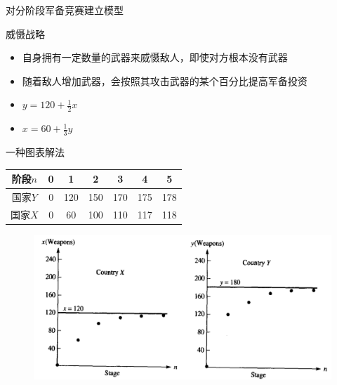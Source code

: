 \documentclass[mathserif, table]{beamer}
\begin{document}
\begin{frame}{对分阶段军备竞赛建立模型}
  \begin{block}{威慑战略}
    \begin{itemize}
    \item 自身拥有一定数量的武器来威慑敌人，即使对方根本没有武器
    \item 随着敌人增加武器，会按照其攻击武器的某个百分比提高军备投资
    \end{itemize}
  \end{block}
  \begin{itemize}
  \item $y = 120 + \frac{1}{2}x$
  \item $x = 60 + \frac{1}{3}y$
  \end{itemize}

\end{frame}

\begin{frame}{一种图表解法}
  \begin{table}
    \centering
    \begin{tabular}{c|cccccc}
      阶段$n$ & 0 & 1 & 2 & 3 & 4 & 5\\
      \hline
      国家$Y$ & 0 & 120 & 150 & 170 & 175 & 178\\
      国家$X$ & 0 & 60 & 100 & 110 & 117 & 118
    \end{tabular}
  \end{table}

  \begin{figure}
    \centering
    \includegraphics[width=.7\textwidth]{dar.png}
  \end{figure}
  
\end{frame}
\end{document}
